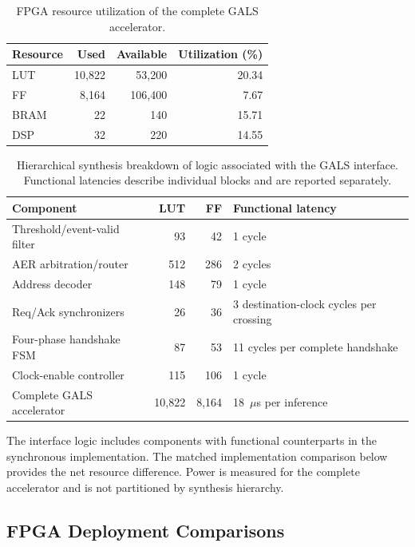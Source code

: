 ﻿\documentclass[12pt]{article}
\begin{document}
\begin{table}[!htbp]
\centering
\caption{FPGA resource utilization of the complete GALS accelerator.}
\label{tab:fpga_resource}
\footnotesize
\renewcommand{\arraystretch}{1.2}
\setlength{\tabcolsep}{4pt}
\begin{tabular}{@{}lrrr@{}}
\toprule
Resource & Used & Available & Utilization (\%) \\
\midrule
LUT & 10,822 & 53,200 & 20.34 \\
FF & 8,164 & 106,400 & 7.67 \\
BRAM & 22 & 140 & 15.71 \\
DSP & 32 & 220 & 14.55 \\
\bottomrule
\end{tabular}
\end{table}

\begin{table}[!htbp]
\centering
\caption{Hierarchical synthesis breakdown of logic associated with the GALS interface. Functional latencies describe individual blocks and are reported separately.}
\label{tab:gals_component_overhead}
\scriptsize
\renewcommand{\arraystretch}{1.15}
\setlength{\tabcolsep}{3pt}
\begin{tabular}{@{}lrrl@{}}
\toprule
Component & LUT & FF & Functional latency \\
\midrule
Threshold/event-valid filter & 93 & 42 & 1 cycle \\
AER arbitration/router & 512 & 286 & 2 cycles \\
Address decoder & 148 & 79 & 1 cycle \\
Req/Ack synchronizers & 26 & 36 & 3 destination-clock cycles per crossing \\
Four-phase handshake FSM & 87 & 53 & 11 cycles per complete handshake \\
Clock-enable controller & 115 & 106 & 1 cycle \\
\midrule
Complete GALS accelerator & 10,822 & 8,164 & 18~$\mu$s per inference \\
\bottomrule
\end{tabular}
\end{table}

The interface logic includes components with functional counterparts in the synchronous implementation. The matched implementation comparison below provides the net resource difference. Power is measured for the complete accelerator and is not partitioned by synthesis hierarchy.

\subsection{FPGA Deployment Comparisons}
\end{document}
